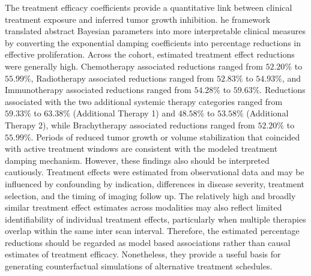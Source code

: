The treatment efficacy coefficients provide a quantitative link between clinical treatment exposure and inferred tumor growth inhibition. he framework translated abstract Bayesian parameters into more interpretable clinical measures by converting the exponential damping coefficients into percentage reductions in effective proliferation. Across the cohort, estimated treatment effect reductions were generally high. Chemotherapy associated reductions ranged from $52.20\%$ to $55.99\%$, Radiotherapy associated reductions ranged from $52.83\%$ to $54.93\%$, and Immunotherapy associated reductions ranged from $54.28\%$ to $59.63\%$. Reductions associated with the two additional systemic therapy categories ranged from $59.33\%$ to $63.38\%$ (Additional Therapy 1) and $48.58\%$ to $53.58\%$ (Additional Therapy 2), while Brachytherapy associated reductions ranged from $52.20\%$ to $55.99\%$. Periods of reduced tumor growth or volume stabilization that coincided with active treatment windows are consistent with the modeled treatment damping mechanism. However, these findings also should be interpreted cautiously. Treatment effects were estimated from observational data and may be influenced by confounding by indication, differences in disease severity, treatment selection, and the timing of imaging follow up. The relatively high and broadly similar treatment effect estimates across modalities may also reflect limited identifiability of individual treatment effects, particularly when multiple therapies overlap within the same inter scan interval. Therefore, the estimated percentage reductions should be regarded as model based associations rather than causal estimates of treatment efficacy. Nonetheless, they provide a useful basis for generating counterfactual simulations of alternative treatment schedules.

